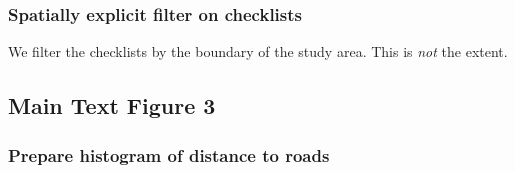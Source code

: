 \documentclass[]{article}
\newenvironment{Shaded}{}{}
\newcommand{\CommentTok}[1]{\textcolor[rgb]{0.00,0.50,0.00}{#1}}
\newcommand{\DataTypeTok}[1]{#1}
\newcommand{\DecValTok}[1]{#1}
\newcommand{\KeywordTok}[1]{\textcolor[rgb]{0.00,0.00,1.00}{#1}}
\newcommand{\NormalTok}[1]{#1}
\newcommand{\OperatorTok}[1]{#1}
\newcommand{\StringTok}[1]{\textcolor[rgb]{0.00,0.50,0.50}{#1}}
\begin{document}
\hypertarget{spatially-explicit-filter-on-checklists}{%
\subsubsection{Spatially explicit filter on checklists}\label{spatially-explicit-filter-on-checklists}}

We filter the checklists by the boundary of the study area. This is \emph{not} the extent.

\begin{Shaded}
\end{Shaded}

\hypertarget{main-text-figure-3}{%
\subsection{Main Text Figure 3}\label{main-text-figure-3}}

\hypertarget{prepare-histogram-of-distance-to-roads}{%
\subsubsection{Prepare histogram of distance to roads}\label{prepare-histogram-of-distance-to-roads}}
\end{document}

